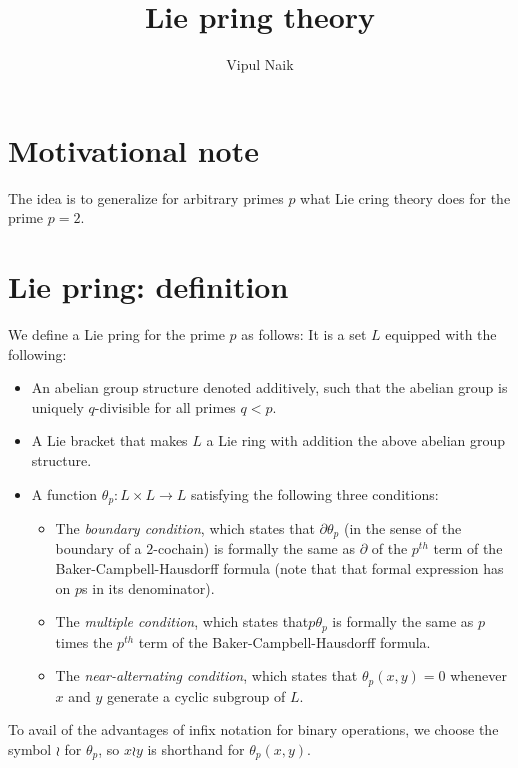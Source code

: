 \documentclass[10pt]{amsart}
\title{Lie pring theory}
\author{Vipul Naik}
\begin{document}
\maketitle

\section*{Motivational note}

The idea is to generalize for arbitrary primes $p$ what Lie cring
theory does for the prime $p = 2$.

\section{Lie pring: definition}

We define a Lie pring for the prime $p$ as follows: It is a set $L$
equipped with the following:

\begin{itemize}
\item An abelian group structure denoted additively, such that the
  abelian group is uniquely $q$-divisible for all primes $q < p$.
\item A Lie bracket that makes $L$ a Lie ring with addition the above
  abelian group structure.
\item A function $\theta_p: L \times L \to L$ satisfying the following
  three conditions: 

  \begin{itemize}
  \item The {\em boundary condition}, which states that
    $\partial \theta_p$ (in the sense of the boundary of a $2$-cochain)
    is formally the same as $\partial$ of the $p^{th}$ term of the
    Baker-Campbell-Hausdorff formula (note that that formal expression
    has on $p$s in its denominator).
  \item The {\em multiple condition}, which states that$p\theta_p$ is
    formally the same as $p$ times the $p^{th}$ term of the
    Baker-Campbell-Hausdorff formula.
  \item The {\em near-alternating condition}, which states that
    $\theta_p(x,y) = 0$ whenever $x$ and $y$ generate a cyclic
    subgroup of $L$.
  \end{itemize}
\end{itemize}

To avail of the advantages of infix notation for binary operations, we
choose the symbol $\wr$ for $\theta_p$, so $x \wr y$ is shorthand for
$\theta_p(x,y)$.
\end{document}
